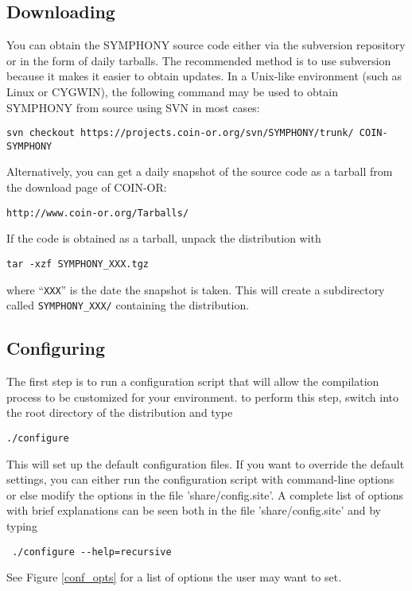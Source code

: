 \subsection{Downloading}

You can obtain the SYMPHONY source code either via the subversion repository
or in the form of daily tarballs. The recommended method is to use subversion
because it makes it easier to obtain updates. In a Unix-like environment (such
as Linux or CYGWIN), the following command may be used to obtain SYMPHONY from
source using SVN in most cases:
{\color{Brown}
\begin{verbatim}
svn checkout https://projects.coin-or.org/svn/SYMPHONY/trunk/ COIN-SYMPHONY
\end{verbatim}
}
Alternatively, you can get a daily snapshot of the source code as a tarball
from the download page of COIN-OR:
{\color{Brown}
\begin{verbatim}
http://www.coin-or.org/Tarballs/
\end{verbatim}
}
If the code is obtained as a tarball, unpack the distribution with 
{\color{Brown}
\begin{verbatim}
tar -xzf SYMPHONY_XXX.tgz
\end{verbatim}
}
where ``\texttt{XXX}'' is the date the snapshot is taken. This will create a
subdirectory called \texttt{SYMPHONY\_XXX/} containing the distribution.

\subsection{Configuring}

The first step is to run a configuration script that will allow the
compilation process to be customized for your environment. to perform this
step, switch into the root directory of the distribution and type
{\color{Brown}
\begin{verbatim}
./configure 
\end{verbatim}
}
This will set up the default configuration files. If you want to override the
default settings, you can either run the configuration script with
command-line options or else modify the options in the file
'share/config.site'. A complete list of options with brief
explanations can be seen both in the file 'share/config.site' and by typing
{\color{Brown}
\begin{verbatim}
 ./configure --help=recursive 
\end{verbatim}
}
See Figure \ref{conf_opts} for a list of options the user may want to set. 

